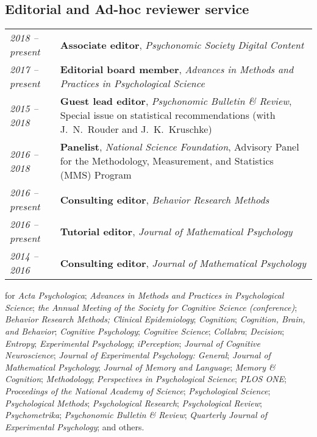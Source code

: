 \documentclass[]{article}
\def\slist{\begin{longtable}{>{\em}p{1.25in} p{5.0in}}}
\def\elist{\end{longtable}}
\renewcommand{\textbf}[1]{{\bf\color{Bordeaux}#1}}
\begin{document}
\subsection*{Editorial and Ad-hoc reviewer service}
\slist
2018 -- present & \textbf{Associate editor}, \textit{Psychonomic Society Digital Content}\\
2017 -- present & \textbf{Editorial board member}, \textit{Advances in Methods 
                  and Practices in Psychological Science}\\
2015 -- 2018    & \textbf{Guest lead editor}, 
 				  \textit{Psychonomic Bulletin \& Review}, Special
                  issue on statistical recommendations (with J.~N.~Rouder and J.~K.~Kruschke)\\
2016 -- 2018    & \textbf{Panelist}, \textit{National Science Foundation},
				  Advisory Panel for the Methodology, Measurement,
                  and Statistics (MMS) Program\\
2016 -- present & \textbf{Consulting editor}, 
			      \textit{Behavior Research Methods}\\
2016 -- present & \textbf{Tutorial editor}, 
				  \textit{Journal of Mathematical Psychology}\\
2014 -- 2016    & \textbf{Consulting editor}, 
			      \textit{Journal of Mathematical Psychology}\\
\elist

\noindent\textbf{Ad hoc reviewer} for \textit{Acta Psychologica}; \textit{Advances in Methods and Practices in Psychological Science}; \textit{the Annual Meeting of the Society for Cognitive Science (conference)}; \textit{Behavior Research Methods; Clinical Epidemiology}; \textit{Cognition}; \textit{Cognition, Brain, and Behavior}; \textit{Cognitive Psychology}; \textit{Cognitive Science}; \textit{Collabra}; \textit{Decision}; \textit{Entropy}; \textit{Experimental Psychology}; \textit{iPerception}; \textit{Journal of Cognitive Neuroscience}; \textit{Journal of Experimental Psychology: General}; \textit{Journal of Mathematical Psychology}; \textit{Journal of Memory and Language}; \textit{Memory \& Cognition}; \textit{Methodology}; \textit{Perspectives in Psychological Science}; \textit{PLOS ONE}; \textit{Proceedings of the National Academy of Science}; \textit{Psychological Science}; \textit{Psychological Methods}; \textit{Psychological Research}; \textit{Psychological Review}; \textit{Psychometrika}; \textit{Psychonomic Bulletin \& Review}; \textit{Quarterly Journal of Experimental Psychology}; and others.\\
\end{document}
